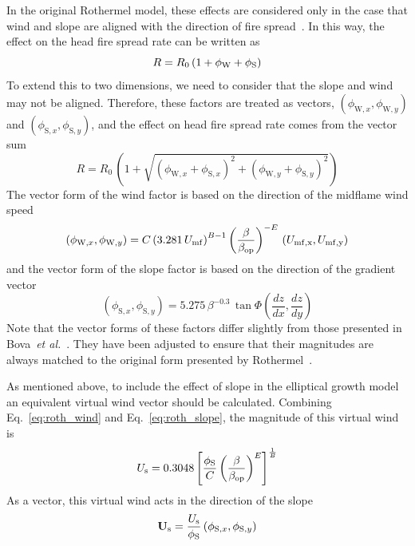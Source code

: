 In the original Rothermel model, these effects are considered only in the case that wind and slope are aligned with the direction of fire spread~\cite{Rothermel:1972}. In this way, the effect on the head fire spread rate can be written as
\begin{equation}
R = R_0 \, (1+ \phi_{\rm W} + \phi_{\rm S})
\end{equation}
To extend this to two dimensions, we need to consider that the slope and wind may not be aligned. Therefore, these factors are treated as vectors, $(\phi_{\mathrm{W},x}, \phi_{\mathrm{W},y})$ and $(\phi_{\mathrm{S},x}, \phi_{\mathrm{S},y})$, and the effect on head fire spread rate comes from the vector sum
\begin{equation}
R = R_0 \, \left(1 + \sqrt{(\phi_{\mathrm{W},x} + \phi_{\mathrm{S},x})^2 + (\phi_{\mathrm{W},y} + \phi_{\mathrm{S},y})^2}\right)
\end{equation}
The vector form of the wind factor is based on the direction of the midflame wind speed
\begin{equation}
(\phi_{\mathrm{W},x}, \phi_{\mathrm{W},y}) = 
C \left(3.281 \, U_{\rm mf}\right)^{B-1}\left(\frac{\beta}{\beta_{\rm op}}\right)^{-E} \, (U_{\rm mf,x},U_{\rm mf,y})
\end{equation}
and the vector form of the slope factor is based on the direction of the gradient vector
\begin{equation}
(\phi_{\mathrm{S},x}, \phi_{\mathrm{S},y}) = 
5.275 \, \beta^{-0.3} \, \tan \Phi \left(\frac{dz}{dx},\frac{dz}{dy}\right)
\end{equation}
Note that the vector forms of these factors differ slightly from those presented in Bova~\textit{et al.}~\cite{Bova:IJWF2015}. They have been adjusted to ensure that their magnitudes are always matched to the original form presented by Rothermel~\cite{Rothermel:1972}.

As mentioned above, to include the effect of slope in the elliptical growth model an equivalent virtual wind vector should be calculated. Combining Eq.~\ref{eq:roth_wind} and Eq.~\ref{eq:roth_slope}, the magnitude of this virtual wind is
\begin{equation}
U_{\rm s} = 0.3048\left[\frac{\phi_{\rm S}}{C}\left(\frac{\beta}{\beta_{\mathrm{op}}}\right)^{E} 
\right]^{\frac{1}{B}}
\end{equation}
As a vector, this virtual wind acts in the direction of the slope
\begin{equation}
\mathbf{U}_{\rm s} = \frac{U_{\rm s}}{\phi_{\rm S}} \left(\phi_{\mathrm{S},x},\phi_{\mathrm{S},y}\right)
\end{equation}

